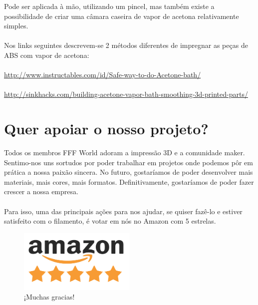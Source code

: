 \documentclass[11pt,a4paper]{article}
\begin{document}
Pode ser aplicada à mão, utilizando um pincel, mas também existe a possibilidade de criar uma câmara caseira de vapor de acetona relativamente simples.
\\\\
Nos links seguintes descrevem-se 2 métodos diferentes de impregnar as peças de ABS com vapor de acetona:
\\\\
\url{http://www.instructables.com/id/Safe-way-to-do-Acetone-bath/}\\\\
\url{http://sinkhacks.com/building-acetone-vapor-bath-smoothing-3d-printed-parts/}
\section{Quer apoiar o nosso projeto?}
Todos os membros FFF World adoram a impressão 3D e a comunidade maker. Sentimo-nos uns sortudos por poder trabalhar em projetos onde podemos pôr em prática a nossa paixão sincera. No futuro, gostaríamos de poder desenvolver mais materiais, mais cores, mais formatos. Definitivamente, gostaríamos de poder fazer crescer a nossa empresa.
\\\\
Para isso, uma das principais ações para nos ajudar, se quiser fazê-lo e estiver satisfeito com o filamento, é votar em nós no Amazon com 5 estrelas.
\begin{figure}[H]
\centering
\includegraphics[width=0.5\textwidth,cfbox=azul_marcos 1pt 0pt]{FOTOS/AMAZON_FIVE_STARS}
\caption*{¡Muchas gracias!}
\end{figure}
\end{document}
